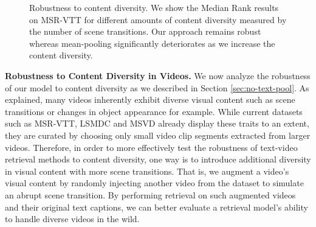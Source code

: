 \documentclass[10pt,twocolumn,letterpaper]{article}
\begin{document}
\begin{figure}[t]
\centering
{}
\caption{Robustness to content diversity. We show the  Median Rank results on MSR-VTT for different amounts of content diversity measured by the number of scene transitions. Our \ModelName{} approach remains robust whereas mean-pooling significantly deteriorates as we increase the content diversity.}
\label{fig:augmentation_exp}
\end{figure}

\textbf{Robustness to Content Diversity in Videos.} 
We now analyze the robustness of our model to content diversity as we described in Section \ref{sec:no-text-pool}. As explained, many videos inherently exhibit diverse visual content such as scene transitions or changes in object appearance for example. While current datasets such as MSR-VTT, LSMDC and MSVD already display these traits to an extent, they
are curated by choosing only small video clip segments extracted from larger videos. 
Therefore, in order to more effectively test the robustness of text-video retrieval methods to content diversity, one way is to 
introduce additional diversity in visual content with more scene transitions. That is, we augment a video's visual content by randomly injecting another video from the dataset to simulate an abrupt scene transition.  By performing retrieval on such augmented videos and their original text captions, we can better evaluate a retrieval model's ability to handle diverse videos in the wild.
\end{document}
